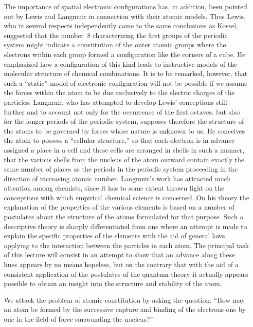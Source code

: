 The importance of spatial electronic configurations has, in addition,
been pointed out by Lewis and Langmuir in connection with their
atomic models. Thus Lewis, who in several respects independently
came to the same conclusions as Kossel, suggested that the number~$8$
characterizing the first groups of the periodic system might indicate
a constitution of the outer atomic groups where the electrons
within each group formed a configuration like the corners of a cube.
He emphasized how a configuration of this kind leads to instructive
models of the molecular structure of chemical combinations. It is
to be remarked, however, that such a ``static'' model of electronic
configuration will not be possible if we assume the forces within
the atom to be due exclusively to the electric charges of the
particles. Langmuir, who has attempted to develop Lewis' conceptions
still further and to account not only for the occurrence of
the first octaves, but also for the longer periods of the periodic
system, supposes therefore the structure of the atoms to be governed
by forces whose nature is unknown to us. He conceives the atom
to possess a ``cellular structure,'' so that each electron is in advance
assigned a place in a cell and these cells are arranged in shells in
such a manner, that the various shells from the nucleus of the atom
outward contain exactly the same number of places as the periods
in the periodic system proceeding in the direction of increasing
atomic number. Langmuir's work has attracted much attention
among chemists, since it has to some extent thrown light on the
conceptions with which empirical chemical science is concerned.
On his theory the explanation of the properties of the various
elements is based on a number of postulates about the structure of
the atoms formulated for that purpose. Such a descriptive theory
is sharply differentiated from one where an attempt is made to
explain the specific properties of the elements with the aid of
general laws applying to the interaction between the particles in
each atom. The principal task of this lecture will consist in an
attempt to show that an advance along these lines appears by no
means hopeless, but on the contrary that with the aid of a consistent
application of the postulates of the quantum theory it
actually appears possible to obtain an insight into the structure
and stability of the atom.



We attack the problem of atomic constitution by asking the
question: ``How may an atom be formed by the successive capture
and binding of the electrons one by one in the field of force surrounding
the nucleus?''

